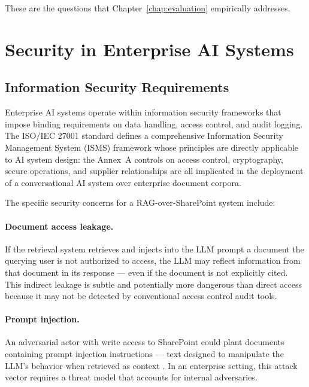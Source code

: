 These are the questions that Chapter~\ref{chap:evaluation} empirically addresses.

\section{Security in Enterprise AI Systems}
\label{sec:bg-security}

\subsection{Information Security Requirements}

Enterprise AI systems operate within information security frameworks that impose binding requirements on data handling, access control, and audit logging. The ISO/IEC 27001 standard \citep{ISO27001} defines a comprehensive Information Security Management System (ISMS) framework whose principles are directly applicable to AI system design: the Annex~A controls on access control, cryptography, secure operations, and supplier relationships are all implicated in the deployment of a conversational AI system over enterprise document corpora.

The specific security concerns for a RAG-over-SharePoint system include:

\paragraph{Document access leakage.} If the retrieval system retrieves and injects into the LLM prompt a document the querying user is not authorized to access, the LLM may reflect information from that document in its response — even if the document is not explicitly cited. This indirect leakage is subtle and potentially more dangerous than direct access because it may not be detected by conventional access control audit tools.

\paragraph{Prompt injection.} An adversarial actor with write access to SharePoint could plant documents containing prompt injection instructions — text designed to manipulate the LLM's behavior when retrieved as context \citep{Perez2022}. In an enterprise setting, this attack vector requires a threat model that accounts for internal adversaries.

